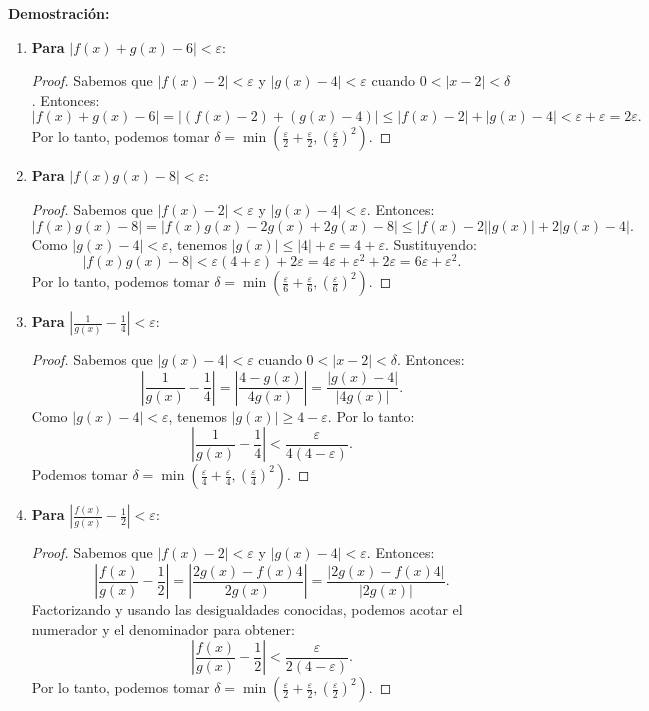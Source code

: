 \textbf{Demostración:}
\begin{enumerate}
    \item \textbf{Para } $|f(x) + g(x) - 6| < \varepsilon$:
    \begin{proof}
    Sabemos que $|f(x) - 2| < \varepsilon$ y $|g(x) - 4| < \varepsilon$ cuando $0 < |x - 2| < \delta$. Entonces:
    \[
    |f(x) + g(x) - 6| = |(f(x) - 2) + (g(x) - 4)| \leq |f(x) - 2| + |g(x) - 4| < \varepsilon + \varepsilon = 2\varepsilon.
    \]
    Por lo tanto, podemos tomar $\delta = \min\left(\frac{\varepsilon}{2} + \frac{\varepsilon}{2}, \left(\frac{\varepsilon}{2}\right)^2\right)$.
    \end{proof}

    \item \textbf{Para } $|f(x)g(x) - 8| < \varepsilon$:
    \begin{proof}
    Sabemos que $|f(x) - 2| < \varepsilon$ y $|g(x) - 4| < \varepsilon$. Entonces:
    \[
    |f(x)g(x) - 8| = |f(x)g(x) - 2g(x) + 2g(x) - 8| \leq |f(x) - 2||g(x)| + 2|g(x) - 4|.
    \]
    Como $|g(x) - 4| < \varepsilon$, tenemos $|g(x)| \leq |4| + \varepsilon = 4 + \varepsilon$. Sustituyendo:
    \[
    |f(x)g(x) - 8| < \varepsilon(4 + \varepsilon) + 2\varepsilon = 4\varepsilon + \varepsilon^2 + 2\varepsilon = 6\varepsilon + \varepsilon^2.
    \]
    Por lo tanto, podemos tomar $\delta = \min\left(\frac{\varepsilon}{6} + \frac{\varepsilon}{6}, \left(\frac{\varepsilon}{6}\right)^2\right)$.
    \end{proof}

    \item \textbf{Para } $\left|\frac{1}{g(x)} - \frac{1}{4}\right| < \varepsilon$:
    \begin{proof}
    Sabemos que $|g(x) - 4| < \varepsilon$ cuando $0 < |x - 2| < \delta$. Entonces:
    \[
    \left|\frac{1}{g(x)} - \frac{1}{4}\right| = \left|\frac{4 - g(x)}{4g(x)}\right| = \frac{|g(x) - 4|}{|4g(x)|}.
    \]
    Como $|g(x) - 4| < \varepsilon$, tenemos $|g(x)| \geq 4 - \varepsilon$. Por lo tanto:
    \[
    \left|\frac{1}{g(x)} - \frac{1}{4}\right| < \frac{\varepsilon}{4(4 - \varepsilon)}.
    \]
    Podemos tomar $\delta = \min\left(\frac{\varepsilon}{4} + \frac{\varepsilon}{4}, \left(\frac{\varepsilon}{4}\right)^2\right)$.
    \end{proof}

    \item \textbf{Para } $\left|\frac{f(x)}{g(x)} - \frac{1}{2}\right| < \varepsilon$:
    \begin{proof}
    Sabemos que $|f(x) - 2| < \varepsilon$ y $|g(x) - 4| < \varepsilon$. Entonces:
    \[
    \left|\frac{f(x)}{g(x)} - \frac{1}{2}\right| = \left|\frac{2g(x) - f(x)4}{2g(x)}\right| = \frac{|2g(x) - f(x)4|}{|2g(x)|}.
    \]
    Factorizando y usando las desigualdades conocidas, podemos acotar el numerador y el denominador para obtener:
    \[
    \left|\frac{f(x)}{g(x)} - \frac{1}{2}\right| < \frac{\varepsilon}{2(4 - \varepsilon)}.
    \]
    Por lo tanto, podemos tomar $\delta = \min\left(\frac{\varepsilon}{2} + \frac{\varepsilon}{2}, \left(\frac{\varepsilon}{2}\right)^2\right)$.
    \end{proof}
\end{enumerate}